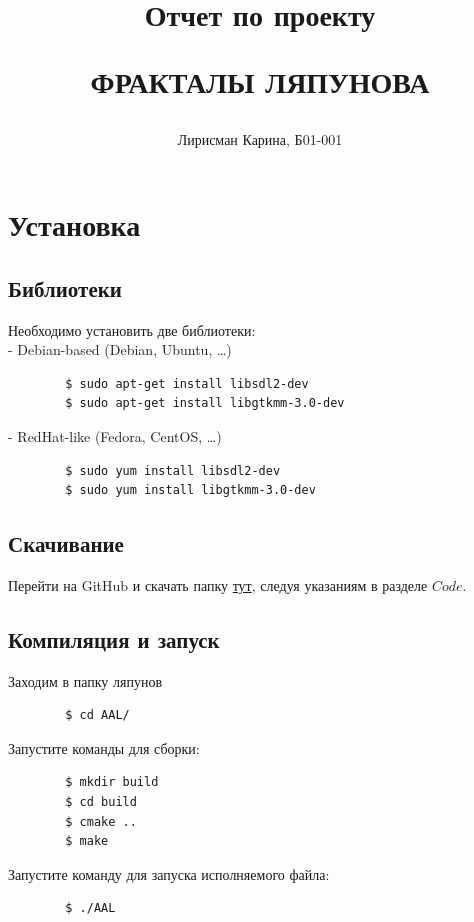 \documentclass[a5paper,10pt, twoside]{article} %
\title
{
\hfill \break	\hfill \break
\hfill \break	\hfill \break
Отчет по проекту

ФРАКТАЛЫ ЛЯПУНОВА
}
\author{Лирисман Карина, Б01-001}
\begin{document}
\maketitle


\thispagestyle{empty} %

\newpage

\tableofcontents %
\thispagestyle{plain}
\newpage


\section{Установка}

  \subsection{Библиотеки}
    \noindent Необходимо установить две библиотеки: \\
	  - Debian-based (Debian, Ubuntu, \ldots)
	  \begin{lstlisting}
	  	$ sudo apt-get install libsdl2-dev 
	  	$ sudo apt-get install libgtkmm-3.0-dev 
	  \end{lstlisting}
	  - RedHat-like (Fedora, CentOS, \ldots)
	  \begin{lstlisting}
	  	$ sudo yum install libsdl2-dev 
	  	$ sudo yum install libgtkmm-3.0-dev 
	  \end{lstlisting}

  \subsection{Скачивание}
    Перейти на GitHub и скачать папку \href{https://github.com/TheRedHotHabanero/AAL}{тут}, следуя указаниям в разделе $Code$.

  \subsection{Компиляция и запуск}
    \noindent Заходим в папку ляпунов
	  \begin{lstlisting}
	  	$ cd AAL/
	  \end{lstlisting}
	  Запустите команды для сборки:
	  \begin{lstlisting}
	  	$ mkdir build
	  	$ cd build
	  	$ cmake ..
	  	$ make
    \end{lstlisting}
	  Запустите команду для запуска исполняемого файла:
	  \begin{lstlisting}
	  	$ ./AAL
	  \end{lstlisting}
\end{document}
